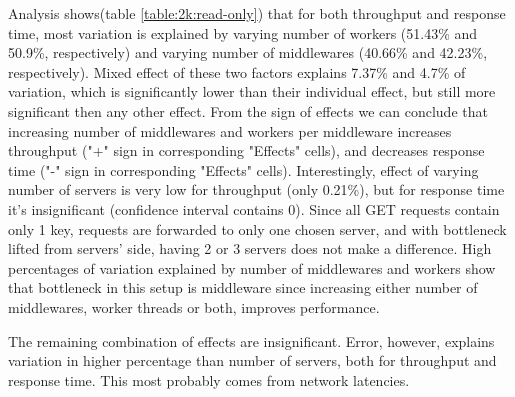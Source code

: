 \documentclass[11pt,a4paper]{article}
\begin{document}
Analysis shows(table \ref{table:2k:read-only}) that for both throughput and response time, most variation is explained by varying number of workers (51.43\% and 50.9\%, respectively) and varying number of middlewares (40.66\% and 42.23\%, respectively). Mixed effect of these two factors explains 7.37\% and 4.7\% of variation, which is significantly lower than their individual effect, but still more significant then any other effect. From the sign of effects we can conclude that increasing number of middlewares and workers per middleware increases throughput ("+" sign in corresponding "Effects" cells), and decreases response time ("-" sign in corresponding "Effects" cells). Interestingly, effect of varying number of servers is very low for throughput (only 0.21\%), but for response time it's insignificant (confidence interval contains 0). Since all GET requests contain only 1 key, requests are forwarded to only one chosen server, and with bottleneck lifted from servers' side, having 2 or 3 servers does not make a difference. High percentages of variation explained by number of middlewares and workers show that bottleneck in this setup is middleware since increasing either number of middlewares, worker threads or both, improves performance.

The remaining combination of effects are insignificant. Error, however, explains variation in higher percentage than number of servers, both for throughput and response time. This most probably comes from network latencies.
\end{document}
